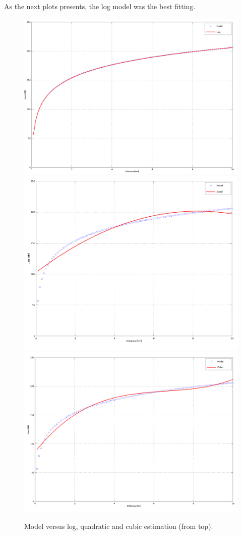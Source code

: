 \documentclass[eng,openany]{mgr}
\begin{document}
As the next plots presents, the log model was the best fitting.
\newpage
\begin{figure}[h]
\centering
\includegraphics[width=0.7\linewidth]{screenshot013}
\includegraphics[width=0.7\linewidth]{screenshot014}
\includegraphics[width=0.7\linewidth]{screenshot015}
\caption{Model versus log, quadratic and cubic estimation (from top).}
\label{fig:screenshot013}
\end{figure}
\end{document}
